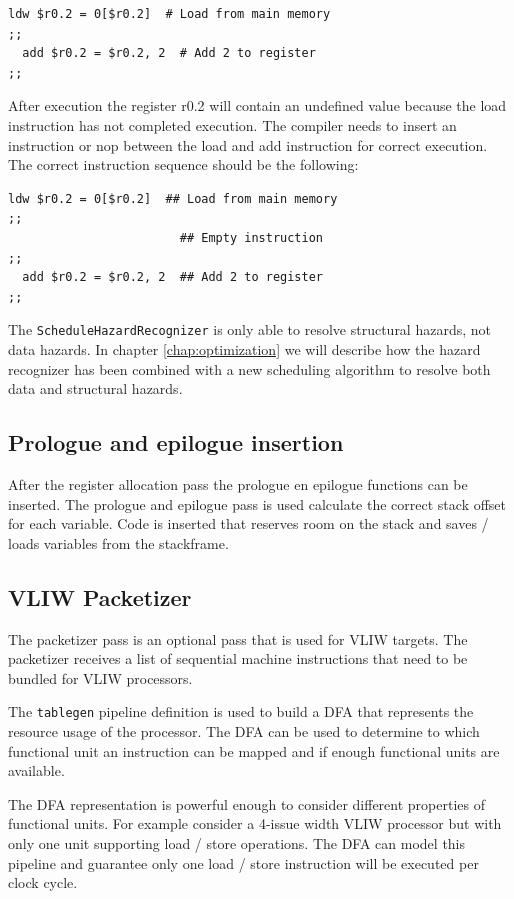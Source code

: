 \begin{lstlisting}[language=rvex]
  ldw $r0.2 = 0[$r0.2]  # Load from main memory
;;
  add $r0.2 = $r0.2, 2  # Add 2 to register
;;
\end{lstlisting}

After execution the register r0.2 will contain an undefined value because the load instruction has not completed execution. The compiler needs to insert an instruction or nop between the load and add instruction for correct execution. The correct instruction sequence should be the following:

\begin{lstlisting}[language=rvex]
  ldw $r0.2 = 0[$r0.2]  ## Load from main memory
;;
                        ## Empty instruction
;;
  add $r0.2 = $r0.2, 2  ## Add 2 to register
;;
\end{lstlisting}

The \texttt{ScheduleHazardRecognizer} is only able to resolve structural hazards, not data hazards. In chapter \ref{chap:optimization} we will describe how the hazard recognizer has been combined with a new scheduling algorithm to resolve both data and structural hazards.

\subsection{Prologue and epilogue insertion}
After the register allocation pass the prologue en epilogue functions can be inserted. The prologue and epilogue pass is used calculate the correct stack offset for each variable. Code is inserted that reserves room on the stack and saves / loads variables from the stackframe.

\subsection{VLIW Packetizer}
The packetizer pass is an optional pass that is used for VLIW targets. The packetizer receives a list of sequential machine instructions that need to be bundled for VLIW processors. 

The \texttt{tablegen} pipeline definition is used to build a DFA that represents the resource usage of the processor. The DFA can be used to determine to which functional unit an instruction can be mapped and if enough functional units are available.

The DFA representation is powerful enough to consider different properties of functional units. For example consider a 4-issue width VLIW processor but with only one unit supporting load / store operations. The DFA can model this pipeline and guarantee only one load / store instruction will be executed per clock cycle.

